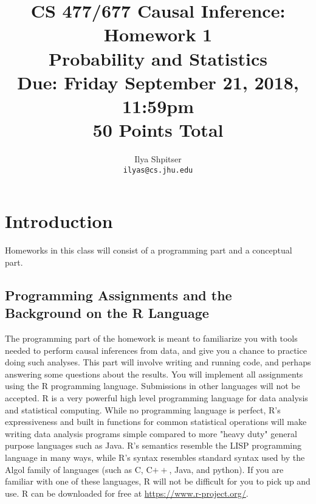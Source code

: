 \documentclass[11pt]{article}
\title{CS 477/677 Causal Inference: Homework 1\\Probability and Statistics\\
\Large{Due: Friday September 21, 2018, 11:59pm}\\
50 Points Total}
\author{Ilya Shpitser\\ \texttt{ilyas@cs.jhu.edu}}
\date{}
\begin{document}
\large
\maketitle
\thispagestyle{headings}

\vspace{-.5in}



\lstset{language=R}

\section{Introduction}

Homeworks in this class will consist of a programming part and a conceptual part.

\subsection{Programming Assignments and the Background on the R Language}

The programming part of the homework is meant to familiarize you with tools needed to perform causal inferences from data, and give you a chance to practice doing such analyses.  This part will involve writing and running code, and perhaps answering some questions about the results.
You will implement all assignments using the R programming language.  Submissions in other languages will not be accepted.  R is a very powerful high level programming language for data analysis and statistical computing.  While no programming language is perfect, R's expressiveness and built in functions for common statistical operations will make writing data analysis programs simple compared to more "heavy duty" general purpose languages such as Java.  R's semantics resemble the LISP programming language in many ways, while R's syntax resembles standard syntax used by the Algol family of languages (such as C, C$++$, Java, and python).  If you are familiar with one of these languages, R will not be difficult for you to pick up and use.  R can be downloaded for free at \href{https://www.r-project.org/}{https://www.r-project.org/}.
\end{document}
